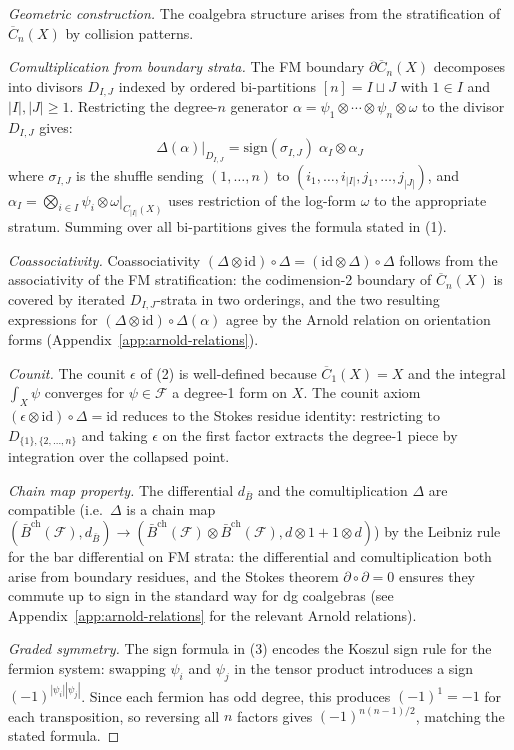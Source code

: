 \begin{proof}[Geometric construction]
The coalgebra structure arises from the stratification of $\overline{C}_n(X)$ by collision patterns.

\noindent\emph{Comultiplication from boundary strata.}
The FM boundary $\partial\overline{C}_n(X)$ decomposes into divisors $D_{I,J}$ indexed by ordered bi-partitions $[n] = I \sqcup J$ with $1 \in I$ and $|I|, |J| \geq 1$.  Restricting the degree-$n$ generator $\alpha = \psi_1 \otimes \cdots \otimes \psi_n \otimes \omega$ to the divisor $D_{I,J}$ gives:
\[
\Delta(\alpha)|_{D_{I,J}} = \mathrm{sign}(\sigma_{I,J})\;\alpha_I \otimes \alpha_J
\]
where $\sigma_{I,J}$ is the shuffle sending $(1,\ldots,n)$ to $(i_1,\ldots,i_{|I|},j_1,\ldots,j_{|J|})$, and $\alpha_I = \bigotimes_{i\in I}\psi_i \otimes \omega|_{C_{|I|}(X)}$ uses restriction of the log-form $\omega$ to the appropriate stratum.  Summing over all bi-partitions gives the formula stated in (1).

\noindent\emph{Coassociativity.}
Coassociativity $(\Delta \otimes \mathrm{id}) \circ \Delta = (\mathrm{id} \otimes \Delta) \circ \Delta$ follows from the associativity of the FM stratification: the codimension-2 boundary of $\overline{C}_n(X)$ is covered by iterated $D_{I,J}$-strata in two orderings, and the two resulting expressions for $(\Delta \otimes \mathrm{id}) \circ \Delta(\alpha)$ agree by the Arnold relation on orientation forms (Appendix~\ref{app:arnold-relations}).

\noindent\emph{Counit.}
The counit $\epsilon$ of (2) is well-defined because $\overline{C}_1(X) = X$ and the integral $\int_X \psi$ converges for $\psi \in \mathcal{F}$ a degree-1 form on $X$.  The counit axiom $(\epsilon \otimes \mathrm{id})\circ\Delta = \mathrm{id}$ reduces to the Stokes residue identity: restricting to $D_{\{1\},\{2,\ldots,n\}}$ and taking $\epsilon$ on the first factor extracts the degree-1 piece by integration over the collapsed point.

\noindent\emph{Chain map property.}
The differential $d_{\bar{B}}$ and the comultiplication $\Delta$ are compatible (i.e.\ $\Delta$ is a chain map $(\bar{B}^{\mathrm{ch}}(\mathcal{F}), d_{\bar{B}}) \to (\bar{B}^{\mathrm{ch}}(\mathcal{F}) \otimes \bar{B}^{\mathrm{ch}}(\mathcal{F}), d \otimes 1 + 1 \otimes d)$) by the Leibniz rule for the bar differential on FM strata: the differential and comultiplication both arise from boundary residues, and the Stokes theorem $\partial \circ \partial = 0$ ensures they commute up to sign in the standard way for dg coalgebras (see Appendix~\ref{app:arnold-relations} for the relevant Arnold relations).

\noindent\emph{Graded symmetry.}
The sign formula in (3) encodes the Koszul sign rule for the fermion system: swapping $\psi_i$ and $\psi_j$ in the tensor product introduces a sign $(-1)^{|\psi_i||\psi_j|}$.  Since each fermion has odd degree, this produces $(-1)^1 = -1$ for each transposition, so reversing all $n$ factors gives $(-1)^{n(n-1)/2}$, matching the stated formula.
\end{proof}

